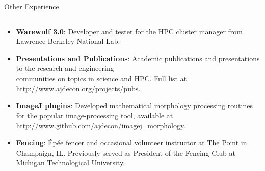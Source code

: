 \documentclass[11pt]{article}
\newcommand{\bigsection}[1]{	
	\vspace{4pt}
	{\fontfamily{phv}\selectfont\Large#1}

	\vspace{-10pt} \rule{\textwidth}{1pt}
}
\begin{document}


\vspace{16pt}


\bigsection{Other Experience}
\vspace{-15pt}
\begin{itemize}\setlength{\itemsep}{0cm}
  \setlength{\parskip}{0cm}
    \item \textbf{Warewulf 3.0}: Developer and tester for the HPC cluster manager from Lawrence Berkeley National Lab.
    \item \textbf{Presentations and Publications}: Academic publications and presentations to the research and engineering \\ 
    communities on topics in science and HPC. Full list at http://www.ajdecon.org/projects/pubs.
    \item \textbf{ImageJ plugins}: Developed mathematical morphology processing routines for the popular image-processing tool, available at http://www.github.com/ajdecon/imagej\_morphology.
    \item \textbf{Fencing}: \'{E}p\'{e}e fencer and occasional volunteer instructor at The Point in Champaign, IL. Previously served as  President of the Fencing Club at Michigan Technological University.

\end{itemize}
\end{document}
